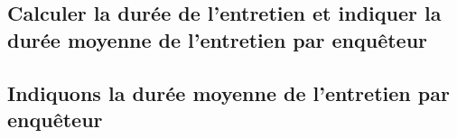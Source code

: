 \documentclass[
  14pt,
]{article}
\newenvironment{Shaded}{\begin{snugshade}}{\end{snugshade}}
\newcommand{\AttributeTok}[1]{\textcolor[rgb]{0.77,0.63,0.00}{#1}}
\newcommand{\CommentTok}[1]{\textcolor[rgb]{0.56,0.35,0.01}{\textit{#1}}}
\newcommand{\ConstantTok}[1]{\textcolor[rgb]{0.00,0.00,0.00}{#1}}
\newcommand{\FunctionTok}[1]{\textcolor[rgb]{0.00,0.00,0.00}{#1}}
\newcommand{\NormalTok}[1]{#1}
\newcommand{\OtherTok}[1]{\textcolor[rgb]{0.56,0.35,0.01}{#1}}
\newcommand{\SpecialCharTok}[1]{\textcolor[rgb]{0.00,0.00,0.00}{#1}}
\begin{document}
\hypertarget{calculer-la-duruxe9e-de-lentretien-et-indiquer-la-duruxe9e-moyenne-de-lentretien-par-enquuxeateur}{%
\subsection{\texorpdfstring{\textbf{Calculer la durée de l'entretien et
indiquer la durée moyenne de l'entretien par enquêteur}\\
}{Calculer la durée de l'entretien et indiquer la durée moyenne de l'entretien par enquêteur }}\label{calculer-la-duruxe9e-de-lentretien-et-indiquer-la-duruxe9e-moyenne-de-lentretien-par-enquuxeateur}}

\begin{Shaded}
\end{Shaded}

\hypertarget{indiquons-la-duruxe9e-moyenne-de-lentretien-par-enquuxeateur}{%
\subsection{\texorpdfstring{Indiquons la durée moyenne de l'entretien
par enquêteur\\
}{Indiquons la durée moyenne de l'entretien par enquêteur }}\label{indiquons-la-duruxe9e-moyenne-de-lentretien-par-enquuxeateur}}
\end{document}
